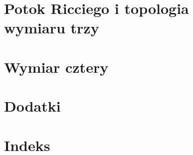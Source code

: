 \documentclass[11pt,a4paper]{report}
\begin{document}

\setcounter{chapter}{22}
\setcounter{part}{3}










\part{Potok Ricciego i topologia wymiaru trzy}




\part{Wymiar cztery}






\part{Dodatki}
\appendix




\part{Indeks}

\end{document}
